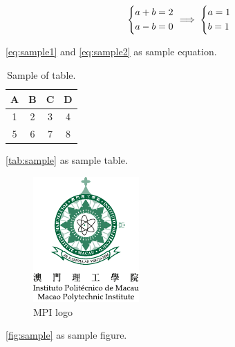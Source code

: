 \begin{equation}\label{eq:sample2}
	\begin{dcases}
		a + b = 2\\
		a - b = 0
	\end{dcases}
	\implies
	\begin{dcases}
		a = 1\\
		b = 1
	\end{dcases}
\end{equation}

\autoref{eq:sample1} and \ref{eq:sample2} as sample equation.


\begin{table} [h]
	\centering
	\caption{Sample of table.}
	\begin{tabular}{|c|c|c|c|}
		\hline
		\textbf{A} & \textbf{B} & \textbf{C} & \textbf{D} \\
		\hline
		1 & 2 & 3 & 4 \\
		\hline
		5 & 6 & 7 & 8 \\
		\hline
	\end{tabular}
	\label{tab:sample}
\end{table}

\autoref{tab:sample} as sample table.

\begin{figure} [h]
	\centering
	\includegraphics[width=0.5\linewidth]{MPI.pdf}
	\caption{MPI logo}
	\label{fig:sample}
\end{figure}

\autoref{fig:sample} as sample figure.